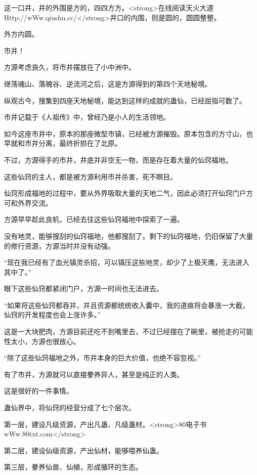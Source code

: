 
\begin{this_body}

这一口井，井的外围是方的，四四方方。<strong>在线阅读天火大道Http://wWw.qiushu.cc/</strong>井口的内围，则是圆的，圆圆整整。

外方内圆。

市井！

方源考虑良久，将市井摆放在了小中洲中。

继荡魂山、落魄谷、逆流河之后，这是方源得到的第四个天地秘境。

纵观古今，搜集到四座天地秘境，能达到这样的成就的蛊仙，已经屈指可数了。

市井记载于《人祖传》中，曾经乃是小人的生活领地。

如今这座市井中，原本的那座微型市镇，已经被方源摧毁。原本包含的方寸山，也早就和市井分离，最终折损在了北原。

不过，方源得手的市井，井底并非空无一物，而是存在着大量的仙窍福地。

这些仙窍的主人，都是被方源利用市井杀害，死不瞑目。

仙窍形成福地的过程中，要从外界吸取大量的天地二气，因此必须打开仙窍门户方可和外界交流。

方源早早趁此良机，已经去往这些仙窍福地中探索了一遍。

没有地灵，能够搜刮的仙窍福地，他都搜刮了。剩下的仙窍福地，仍旧保留了大量的修行资源，方源当时并没有动强。

“现在我已经有了血光镇灵杀招，可以镇压这些地灵，却少了上极天鹰，无法进入其中了。”

眼下这些仙窍都紧闭门户，方源一时间也无法进去。

“如果将这些仙窍都吞并，并且资源都统统收入囊中，我的道痕将会暴涨一大截，仙窍的开发程度也会上涨许多。”

这是一大块肥肉，方源目前还吃不到嘴里去，不过已经摆在了碗里，被抢走的可能性太小，方源也很放心。

“除了这些仙窍福地之外，市井本身的巨大价值，也绝不容忽视。”

有了市井，方源就可以直接豢养异人，甚至是纯正的人类。

这是很好的一件事情。

蛊仙界中，将仙窍的经营分成了七个层次。

第一层，建设凡级资源，产出凡蛊、凡级蛊材。<strong>80电子书wWw.80txt.com</strong>

第二层，建设仙级资源，产出仙材，能够喂养仙蛊。

第三层，豢养仙兽、仙植，形成循环的生态。


\end{this_body}
